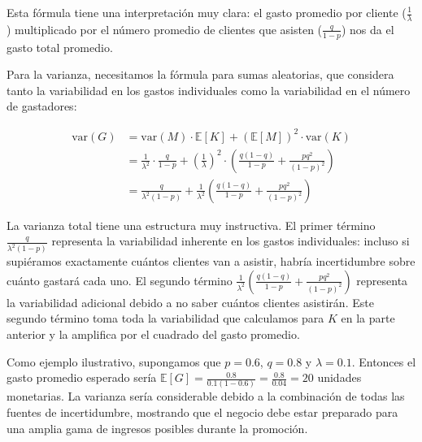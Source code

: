 \documentclass[
  11pt,
  letterpaper,
   addpoints,
  answers
  ]{exam}
\begin{document}
\begin{questions}
\begin{solution}
Esta fórmula tiene una interpretación muy clara: el gasto promedio por cliente ($\frac{1}{\lambda}$) multiplicado por el número promedio de clientes que asisten ($\frac{q}{1-p}$) nos da el gasto total promedio.

Para la varianza, necesitamos la fórmula para sumas aleatorias, que considera tanto la variabilidad en los gastos individuales como la variabilidad en el número de gastadores:

\begin{align}
\text{var}(G) &= \text{var}(M) \cdot \mathbb{E}[K] + (\mathbb{E}[M])^2 \cdot \text{var}(K) \\
&= \frac{1}{\lambda^2} \cdot \frac{q}{1-p} + \left(\frac{1}{\lambda}\right)^2 \cdot \left( \frac{q(1-q)}{1-p} + \frac{pq^2}{(1-p)^2} \right) \\
&= \frac{q}{\lambda^2(1-p)} + \frac{1}{\lambda^2} \left( \frac{q(1-q)}{1-p} + \frac{pq^2}{(1-p)^2} \right)
\end{align}

La varianza total tiene una estructura muy instructiva. El primer término $\frac{q}{\lambda^2(1-p)}$ representa la variabilidad inherente en los gastos individuales: incluso si supiéramos exactamente cuántos clientes van a asistir, habría incertidumbre sobre cuánto gastará cada uno. El segundo término $\frac{1}{\lambda^2} \left( \frac{q(1-q)}{1-p} + \frac{pq^2}{(1-p)^2} \right)$ representa la variabilidad adicional debido a no saber cuántos clientes asistirán. Este segundo término toma toda la variabilidad que calculamos para $K$ en la parte anterior y la amplifica por el cuadrado del gasto promedio.

Como ejemplo ilustrativo, supongamos que $p = 0.6$, $q = 0.8$ y $\lambda = 0.1$. Entonces el gasto promedio esperado sería $\mathbb{E}[G] = \frac{0.8}{0.1(1-0.6)} = \frac{0.8}{0.04} = 20$ unidades monetarias. La varianza sería considerable debido a la combinación de todas las fuentes de incertidumbre, mostrando que el negocio debe estar preparado para una amplia gama de ingresos posibles durante la promoción.
\end{solution}
\end{questions}
\end{document}
